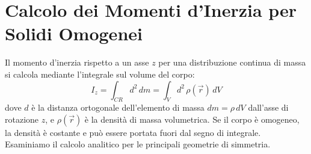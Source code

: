 \section{Calcolo dei Momenti d'Inerzia per Solidi Omogenei}
Il momento d'inerzia rispetto a un asse $z$ per una distribuzione continua di massa si calcola mediante l'integrale sul volume del corpo:
\begin{equation}
    I_z = \int_{CR} d^2 \, dm = \int_{V} d^2 \, \rho(\vec{r}) \, dV
\end{equation}
dove $d$ è la distanza ortogonale dell'elemento di massa $dm = \rho \, dV$ dall'asse di rotazione $z$, e $\rho(\vec{r})$ è la densità di massa volumetrica. Se il corpo è omogeneo, la densità è costante e può essere portata fuori dal segno di integrale. Esaminiamo il calcolo analitico per le principali geometrie di simmetria.


